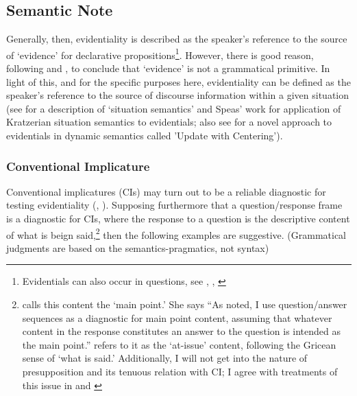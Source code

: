 \documentclass{article}
\begin{document}
\subsection{Semantic Note}
Generally, then, evidentiality is described as the speaker's reference to the source of `evidence' for declarative propositions\footnote{Evidentials can also occur in questions, see \cite{barnes84evd,barnes94negation}, \cite{bowles09tuyucadata}, \cite{murray09hamblinevd,murray09quevd}}. However, there is good reason, following  and \cite{speas04evdparadigms}, to conclude that `evidence' is not a grammatical primitive. In light of this, and for the specific purposes here, evidentiality can be defined as the speaker's reference to the source of discourse information within a given situation (see \citealt{kratzer08situations} for a description of `situation semantics' and Speas' work for application of Kratzerian situation semantics to evidentials; also see \citealt{bittner09ucevd} for a novel approach to evidentials in dynamic semantics called 'Update with Centering').

\subsubsection{Conventional Implicature}
Conventional implicatures (CIs) may turn out to be a reliable diagnostic for testing evidentiality (\citealt{potts07ci}, \citealt{speas08synsemevd}). Supposing furthermore that a question/response frame is a diagnostic for CIs, where the response to a question is the descriptive content of what is beign said,\footnote{\cite{simons07obs} calls this content the `main point.' She says ``As noted, I use question/answer sequences as a diagnostic for main point content, assuming that whatever content in the response constitutes an answer to the question is intended as the main point.'' \cite{potts07ci} refers to it as the `at-issue' content, following the Gricean sense of `what is said.' Additionally, I will not get into the nature of presupposition and its tenuous relation with CI; I agree with treatments of this issue in \cite{potts07ci} and \cite{simons07obs}}\label{mainpoint} then the following examples are suggestive. (Grammatical judgments are based on the semantics-pragmatics, not syntax) 
\end{document}

